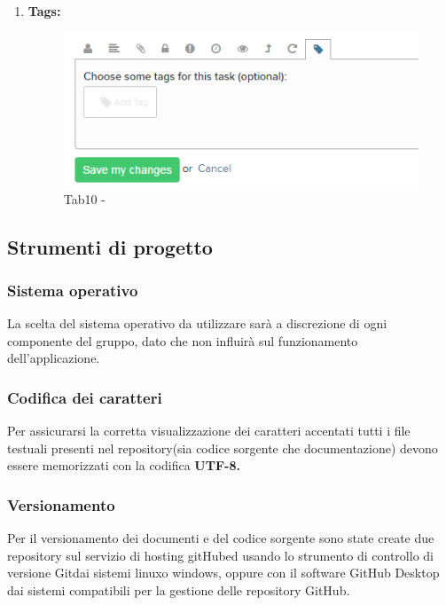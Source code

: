 \documentclass[a4paper,11pt]{article}
\begin{document}
\begin{enumerate}
		\item \textbf{Tags:} 
			\begin{figure}[H]
			\centering
			\includegraphics[scale=0.50]{../images/teamwork_task10.png}
			\caption{  Tab10 -  }	
			\end{figure}
		
		\end{enumerate}
		
			
		
		\subsection{Strumenti di progetto} \label{s:strum} 	
	
		\subsubsection{Sistema operativo}
		La scelta del sistema operativo da utilizzare sarà a discrezione di ogni componente del gruppo, dato che non influirà sul funzionamento dell'applicazione.
		\subsubsection{Codifica dei caratteri}
		Per assicurarsi la corretta visualizzazione dei caratteri accentati tutti i file testuali presenti nel repository\addglos(sia codice sorgente che documentazione) devono essere memorizzati con la codifica\textbf{ UTF-8\addglos.}
		\subsubsection{Versionamento}
		Per il versionamento dei documenti e del codice sorgente sono state create due repository sul servizio di hosting gitHub\addglos ed usando lo strumento di controllo di versione Git\addglos dai sistemi linux\addglos o windows\addglos, oppure con il software GitHub Desktop dai sistemi compatibili per la gestione delle repository GitHub\addglos. 
			
\end{document}
